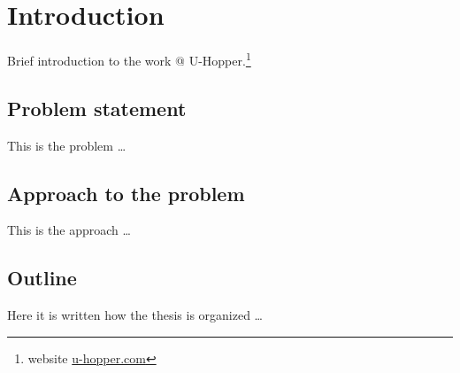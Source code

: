 \chapter{Introduction}
\label{cha:intro}
\vspace{0.5 cm} 

Brief introduction to the work @ U-Hopper.\footnote{ website \href{https://www.u-hopper.com/big-data-analytics/site/index/en}{u-hopper.com}}

\vspace{0.5 cm} 
\section{Problem statement}
\label{sec:problem}
\vspace{0.5 cm} 

This is the problem \dots


\vspace{0.5 cm} 
\section{Approach to the problem} 
\label{sec:approach}
\vspace{0.5 cm} 

This is the approach \dots


\vspace{0.5 cm} 
\section{Outline} 
\label{sec:outline}
\vspace{0.5 cm} 

Here it is written how the thesis is organized \dots
